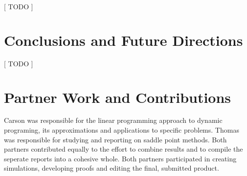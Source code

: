 \documentclass[12pt,reqno]{amsart}
\numberwithin{equation}{section}
\begin{document}
[ TODO ]

\section{Conclusions and Future Directions}



[ TODO ]

\section{Partner Work and Contributions}

Carson was responsible for the linear programming approach to dynamic programing, its approximations and applications to specific problems. Thomas was responsible for studying and reporting on saddle point methods. Both partners contributed equally to the effort to combine results and to compile the seperate reports into a cohesive whole. Both partners participated in creating simulations, developing proofs and editing the final, submitted product.









\bigskip
\end{document}
